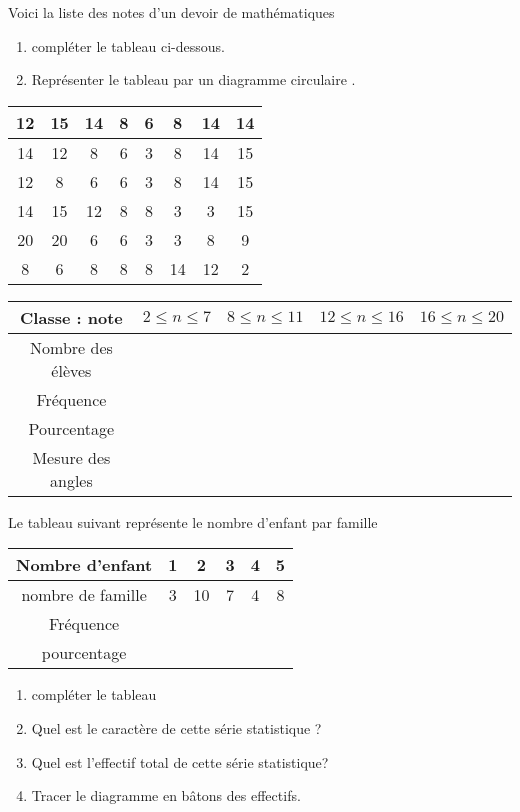 \documentclass[a4paper,12pt]{article}
\begin{document}
\devoir[sem=2,prv=true,ds=false,num=6 ,niv=1 ,date=22/05/2023,Rdate=25/05/2023]


\begin{exo}
\begin{minipage}{.6\linewidth}
Voici la liste des notes d'un devoir de mathématiques 
\begin{enumerate}
\item compléter le tableau ci-dessous.
\item Représenter le tableau par un diagramme circulaire .
\end{enumerate}
\end{minipage}
\begin{tabular}{c|c|c|c|c|c|c|c}
12 & 15 & 14 & 8 & 6 & 8 & 14 & 14	 \\ 
\hline 
14 & 12 & 8 & 6 & 3 & 8 & 14 & 15	 \\ 
\hline 
12 & 8 & 6 & 6 & 3 & 8 & 14 & 15	 \\ 
\hline 
14 & 15 & 12 & 8 & 8 & 3 & 3 & 15 \\ 
\hline 
20 & 20 & 6 & 6 & 3 & 3 & 8 & 9 \\ 
\hline 
8 & 6 & 8 & 8 & 8 & 14 & 12 & 2 \\ 
\end{tabular} 

\begin{tabular}{|c|c|c|c|c|}
\hline 
Classe : note  & $2\leq n \leq 7$ & $8\leq n \leq 11$ &$12\leq n \leq 16$ & $16\leq n \leq 20$ \\ 
\hline 
Nombre des élèves &  &  &  &  \\ 
\hline 
Fréquence&  &  &  &  \\ 
\hline 
Pourcentage &  &  &  &  \\ 
\hline 
Mesure des angles &  &  &  &  \\ 
\hline 
\end{tabular} 
\end{exo}

\begin{exo}
Le tableau suivant représente le nombre d'enfant par famille

\begin{tabular}{|c|c|c|c|c|c|}
\hline 
Nombre d'enfant & 1 & 2 & 3 & 4 & 5 \\ 
\hline 
nombre de famille & 3 & 10 & 7 & 4 & 8 \\ 
\hline 
Fréquence  &  &  &  &  &  \\ 
\hline 
pourcentage &  &  &  &  &  \\ 
\hline 
\end{tabular} 
\begin{enumerate}
\item compléter le tableau
\item Quel est le caractère de cette série statistique ?
\item Quel est l'effectif total de cette série statistique?
\item Tracer le diagramme en bâtons des effectifs.
\end{enumerate}
\end{exo}
\end{document}
